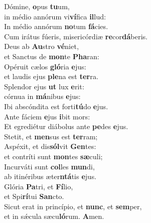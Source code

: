 \evenverse Dómine, \textbf{o}pus \textbf{tu}um,~\*\\
\evenverse in médio annórum vi\textbf{ví}fica \textbf{il}lud:\\
\oddverse In médio annórum \textbf{no}tum \textbf{fá}cies.~\*\\
\oddverse Cum irátus fúeris, misericórdiæ \textbf{re}cor\textbf{dá}beris.\\
\evenverse Deus ab \textbf{Au}stro \textbf{vé}niet,~\*\\
\evenverse et Sanctus de \textbf{mon}te \textbf{Pha}ran:\\
\oddverse Opéruit cælos \textbf{gló}ria \textbf{e}jus:~\*\\
\oddverse et laudis ejus \textbf{ple}na est \textbf{ter}ra.\\
\evenverse Splendor ejus \textbf{ut} lux \textbf{e}rit:~\*\\
\evenverse córnua in \textbf{má}nibus \textbf{e}jus:\\
\oddverse Ibi abscóndita est forti\textbf{tú}do \textbf{e}jus.~\*\\
\oddverse Ante fáciem \textbf{e}jus \textbf{i}bit mors:\\
\evenverse Et egrediétur diábolus ante \textbf{pe}des \textbf{e}jus.~\*\\
\evenverse Stetit, et \textbf{men}sus est \textbf{ter}ram;\\
\oddverse Aspéxit, et dis\textbf{sól}vit \textbf{Gen}tes:~\*\\
\oddverse et contríti sunt \textbf{mon}tes \textbf{sæ}culi;\\
\evenverse Incurváti sunt \textbf{col}les \textbf{mun}di,~\*\\
\evenverse ab itinéribus æter\textbf{ntá}tis \textbf{e}jus.\\
\oddverse Glória \textbf{Pa}tri, et \textbf{Fí}lio,~\*\\
\oddverse et Spi\textbf{rí}tui \textbf{San}cto.\\
\evenverse Sicut erat in princípio, et \textbf{nunc}, et \textbf{sem}per,~\*\\
\evenverse et in sǽcula sæcu\textbf{ló}rum. \textbf{A}men.\\
